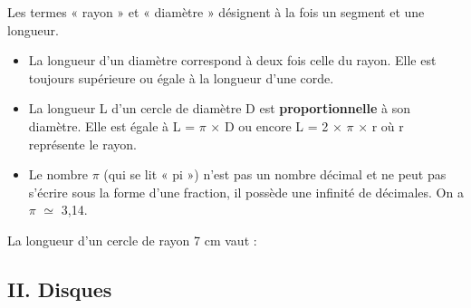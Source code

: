 \begin{Définitions*}[c]
\begin{minipage}[c]{0.3\textwidth}
\begin{center}
\end{center}

\end{minipage}
\end{Définitions*}

\begin{Remarque}
Les termes « rayon » et « diamètre » désignent à la fois un segment et une longueur.
\end{Remarque}

\begin{Propriétés*}
\leavevmode\vspace{-\baselineskip}
\begin{itemize}[label=\textcolor{Couleur1}{$\bullet$}]
\item La longueur d'un diamètre correspond à deux fois celle du rayon. Elle est toujours supérieure ou égale à la longueur d'une corde.
\item La longueur L d'un cercle de diamètre D est \textbf{proportionnelle} à son diamètre. Elle est égale à L = $\pi$ × D ou encore L = 2 × $\pi$ × r où r représente le rayon.
\item Le nombre $\pi$ (qui se lit « pi ») n'est pas un nombre décimal et ne peut pas s'écrire sous la forme d'une fraction, il possède une infinité de décimales. On a $\pi$ $\simeq$ 3,14.
\end{itemize}
\end{Propriétés*}



\begin{Exemple}
La longueur d'un cercle de rayon 7 cm vaut : \ligne

\end{Exemple}


\subsection*{II. Disques}

